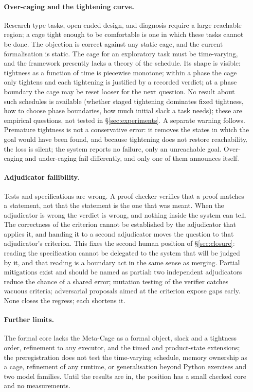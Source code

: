 \paragraph{Over-caging and the tightening curve.}
Research-type tasks, open-ended design, and diagnosis require a large reachable region; a cage tight enough to be comfortable is one in which these tasks cannot be done. The objection is correct against any static cage, and the current formalisation is static. The cage for an exploratory task must be time-varying, and the framework presently lacks a theory of the schedule. Its shape is visible: tightness as a function of time is piecewise monotone; within a phase the cage only tightens and each tightening is justified by a recorded verdict; at a phase boundary the cage may be reset looser for the next question. No result about such schedules is available (whether staged tightening dominates fixed tightness, how to choose phase boundaries, how much initial slack a task needs); these are empirical questions, not tested in \S\ref{sec:experiments}. A separate warning follows. Premature tightness is not a conservative error: it removes the states in which the goal would have been found, and because tightening does not restore reachability, the loss is silent; the system reports no failure, only an unreachable goal. Over-caging and under-caging fail differently, and only one of them announces itself.

\paragraph{Adjudicator fallibility.}
Tests and specifications are wrong. A proof checker verifies that a proof matches a statement, not that the statement is the one that was meant. When the adjudicator is wrong the verdict is wrong, and nothing inside the system can tell. The correctness of the criterion cannot be established by the adjudicator that applies it, and handing it to a second adjudicator moves the question to that adjudicator's criterion. This fixes the second human position of \S\ref{sec:closure}: reading the specification cannot be delegated to the system that will be judged by it, and that reading is a boundary act in the same sense as merging. Partial mitigations exist and should be named as partial: two independent adjudicators reduce the chance of a shared error; mutation testing of the verifier catches vacuous criteria; adversarial proposals aimed at the criterion expose gaps early. None closes the regress; each shortens it.

\paragraph{Further limits.}
The formal core lacks the Meta-Cage as a formal object, slack and a tightness order, refinement to any executor, and the timed and product-state extensions; the preregistration does not test the time-varying schedule, memory ownership as a cage, refinement of any runtime, or generalisation beyond Python exercises and two model families. Until the results are in, the position has a small checked core and no measurements.
